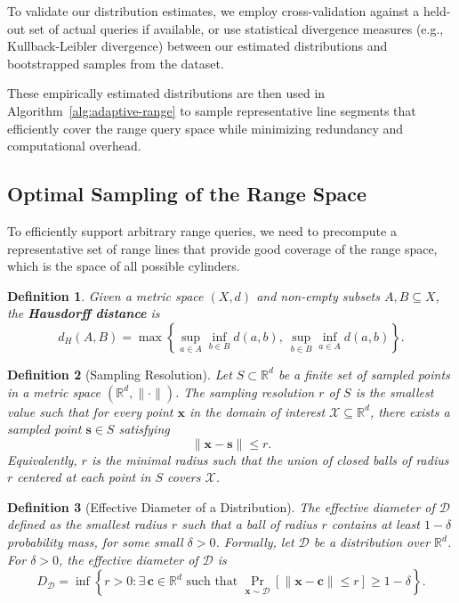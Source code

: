 \documentclass[numbers,sort]{article}
\newtheorem{definition}{Definition}
\begin{document}
To validate our distribution estimates, we employ cross-validation against a held-out set of actual queries if available, or use statistical divergence measures (e.g., Kullback-Leibler divergence) between our estimated distributions and bootstrapped samples from the dataset.

These empirically estimated distributions are then used in Algorithm~\ref{alg:adaptive-range} to sample representative line segments that efficiently cover the range query space while minimizing redundancy and computational overhead.
\subsection{Optimal Sampling of the Range Space}
\label{sec:optimal-sample}
To efficiently support arbitrary range queries, we need to precompute a representative set of range lines that provide good coverage of the range space, which is the space of all possible cylinders.
\begin{definition}
Given a metric space \((X, d)\) and non-empty subsets \(A, B \subseteq X\), the \textbf{Hausdorff distance} is
\[
d_H(A, B) = \max \left\{
    \sup_{a \in A} \inf_{b \in B} d(a, b),\ 
    \sup_{b \in B} \inf_{a \in A} d(a, b)
\right\}.
\]
\end{definition}

\begin{definition}[Sampling Resolution]
\label{def:sampling-resolution}
Let $S \subset \mathbb{R}^d$ be a finite set of sampled points in a metric space $(\mathbb{R}^d, \|\cdot\|)$. The \emph{sampling resolution} $r$ of $S$ is the smallest value such that for every point $\mathbf{x}$ in the domain of interest $\mathcal{X} \subseteq \mathbb{R}^d$, there exists a sampled point $\mathbf{s} \in S$ satisfying
\[
\|\mathbf{x} - \mathbf{s}\| \leq r.
\]
Equivalently, $r$ is the minimal radius such that the union of closed balls of radius $r$ centered at each point in $S$ covers $\mathcal{X}$.
\end{definition}

\begin{definition}[Effective Diameter of a Distribution]
\label{def:effective-diameter}
The effective diameter of $\mathcal{D}$ defined as the smallest radius $r$ such that a ball of radius $r$ contains at least $1-\delta$ probability mass, for some small $\delta > 0$. Formally, let $\mathcal{D}$ be a distribution over $\mathbb{R}^d$. For $\delta > 0$, the \emph{effective diameter} of $\mathcal{D}$ is
\[
D_{\mathcal{D}} = \inf\left\{ r > 0 : \exists\, \mathbf{c} \in \mathbb{R}^d \text{ such that } \Pr_{\mathbf{x} \sim \mathcal{D}}\left[\|\mathbf{x} - \mathbf{c}\| \leq r\right] \geq 1 - \delta \right\}.
\]
\end{definition}
\end{document}
